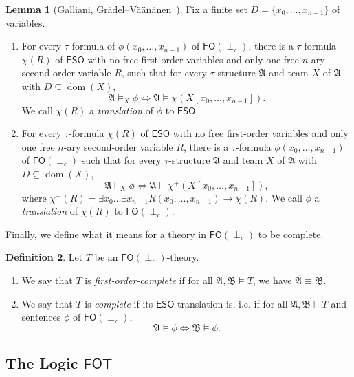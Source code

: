 \documentclass[a4paper]{amsart}
\theoremstyle{definition}
\newtheorem{definition}{Definition}[section]
\newtheorem{lemma}[definition]{Lemma}
\theoremstyle{remark}
\newcommand{\A}{\mathcal{A}}
\newcommand{\B}{\mathcal{B}}
\DeclareMathOperator{\dom}{dom}
\newcommand\fot{\mathsf{FOT}}
\newcommand\eso{\mathsf{ESO}}
\newcommand\foil{\mathsf{FO}(\perp_c)}
\theoremstyle{definition}
\renewcommand{\A}{\mathfrak{A}}
\renewcommand{\B}{\mathfrak{B}}
\begin{document}
\begin{lemma}[Galliani, Grädel--Väänänen~\cite{gradel2013dependence, galliani2012inclusion}]\label{Translation between independence logic and ESO}
    Fix a finite set $D = \{x_0,\dots,x_{n-1}\}$ of variables.
    \begin{enumerate}
        \item For every $\tau$-formula of $\phi(x_0,\dots,x_{n-1})$ of $\foil$, there is a $\tau$-formula $\chi(R)$ of $\eso$ with no free first-order variables and only one free $n$-ary second-order variable $R$, such that for every $\tau$-structure $\A$ and team $X$ of $\A$ with $D\subseteq\dom(X)$,
        \[
            \A\models_X\phi \iff \A\models\chi(X[x_0,\dots,x_{n-1}]).
        \]
        We call $\chi(R)$ a \emph{translation} of $\phi$ to $\eso$.

        \item For every $\tau$-formula $\chi(R)$ of $\eso$ with no free first-order variables and only one free $n$-ary second-order variable $R$, there is a $\tau$-formula $\phi(x_0,\dots,x_{n-1})$ of $\foil$ such that for every $\tau$-structure $\A$ and team $X$ of $\A$ with $D\subseteq\dom(X)$,
        \[
            \A\models_X\phi \iff \A\models\chi^+(X[x_0,\dots,x_{n-1}]),
        \]
        where $\chi^+(R) = \exists x_0\dots\exists x_{n-1} R(x_0,\dots,x_{n-1})\to\chi(R)$. We call $\phi$ a \emph{translation} of $\chi(R)$ to $\foil$.
    \end{enumerate}
\end{lemma}

Finally, we define what it means for a theory in $\foil$ to be complete.

\begin{definition}\label{definition: complete foil-theory and first-order-completeness}
    Let $T$ be an $\foil$-theory.
    \begin{enumerate}
        \item We say that $T$ is \emph{first-order-complete} if for all $\A,\B\models T$, we have $\A\equiv\B$.
        \item We say that $T$ is \emph{complete} if its $\eso$-translation is, i.e. if for all $\A,\B\models T$ and sentences $\phi$ of $\foil$,
        \[
            \A\models\phi \iff \B\models\phi.
        \]
    \end{enumerate}
\end{definition}

\subsection{The Logic $\fot$}
\end{document}
